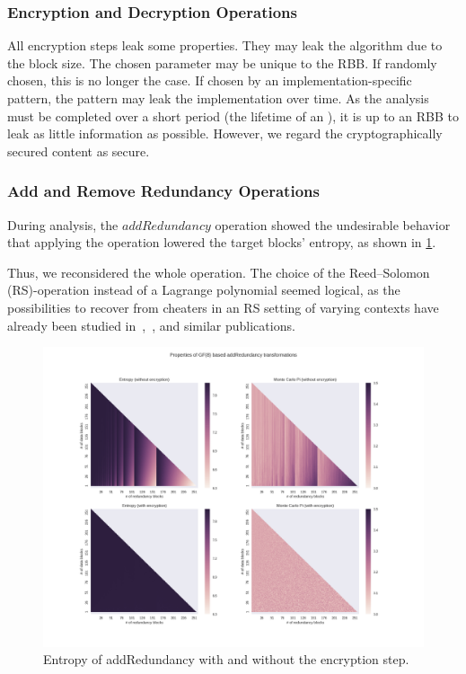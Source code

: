 \subsubsection{Encryption and Decryption Operations}
All encryption steps leak some properties. They may leak the algorithm due to the block size. The chosen parameter may be unique to the RBB. If randomly chosen, this is no longer the case. If chosen by an implementation-specific pattern, the pattern may leak the implementation over time. As the analysis must be completed over a short period (the lifetime of an ), it is up to an RBB to leak as little information as possible. However, we regard the cryptographically secured content as secure. 

\subsubsection{Add and Remove Redundancy Operations}\label{sec:analysisReedSolomon}
During analysis, the $addRedundancy$ operation showed the undesirable behavior that applying the operation lowered the target blocks' entropy, as shown in \cref{fig:entropy}. 

Thus, we reconsidered the whole operation. The choice of the Reed--Solomon (RS)-operation instead of a Lagrange polynomial seemed logical, as the possibilities to recover from cheaters in an RS setting of varying contexts have already been studied in~\cite{mceliece1981sharing},~\cite{bu2017rasss}, and similar publications.

\begin{figure}[!t]\centering
	\includegraphics[width=1\textwidth]{inc/randomblock_10kb}
	\caption{Entropy of addRedundancy with and without the encryption step.}
	\label{fig:entropy}
\end{figure}


